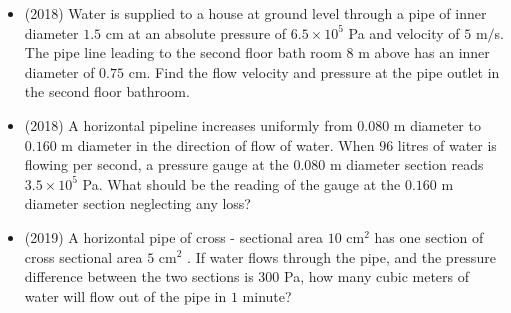 \documentclass{article}
\begin{document}
\begin{itemize}
\item (2018)  Water is supplied to a house at ground level through a pipe of inner diameter $ 1.5$ cm at an absolute pressure of $ 6.5 \times 10^{5}$ Pa and velocity of $ 5$ m$/$s. The pipe line leading to the second floor bath room $ 8$ m above has an inner diameter of $ 0.75$ cm. Find the flow velocity and pressure at the pipe outlet in the second floor bathroom. 
\item (2018)  A horizontal pipeline increases uniformly from $ 0.080$ m diameter to $ 0.160$ m diameter in the direction of flow of water. When $ 96$ litres of water is flowing per second, a pressure gauge at the $ 0.080$ m diameter section reads $ 3.5 \times 10^{5}$ Pa. What should be the reading of the gauge at the $ 0.160$ m diameter section neglecting any loss? 
\item (2019)  A horizontal pipe of cross - sectional area $ 10 $ cm$ ^{2}$ has one section of cross sectional area $ 5 $ cm$ ^{2}$ . If water flows through the pipe, and the pressure difference between the two sections is $ 300$ Pa, how many cubic meters of water will flow out of the pipe in $ 1$ minute?
\end{itemize}
\end{document}
